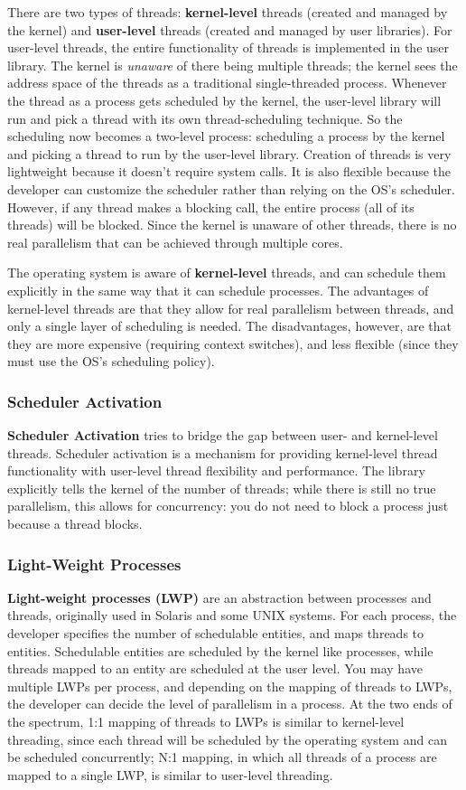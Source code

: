 \documentclass[twoside]{article}
\begin{document}
There are two types of threads: \textbf{kernel-level} threads (created and managed by the kernel) and \textbf{user-level} threads (created and managed by user libraries). For user-level threads, the entire functionality of threads is implemented in the user library. The kernel is \textit{unaware} of there being multiple threads; the kernel sees the address space of the threads as a traditional single-threaded process. Whenever the thread as a process gets scheduled by the kernel, the user-level library will run and pick a thread with its own thread-scheduling technique. So the scheduling now becomes a two-level process: scheduling a process by the kernel and picking a thread to run by the user-level library. Creation of threads is very lightweight because it doesn't require system calls. It is also flexible because the developer can customize the scheduler rather than relying on the OS's scheduler. However, if any thread makes a blocking call, the entire process (all of its threads) will be blocked. Since the kernel is unaware of other threads, there is no real parallelism that can be achieved through multiple cores.

The operating system is aware of \textbf{kernel-level} threads, and can schedule them explicitly in the same way that it can schedule processes. The advantages of kernel-level threads are that they allow for real parallelism between threads, and only a single layer of scheduling is needed. The disadvantages, however, are that they are more expensive (requiring context switches), and less flexible (since they must use the OS's scheduling policy). 

\subsubsection{Scheduler Activation}
\textbf{Scheduler Activation} tries to bridge the gap between user- and kernel-level threads. Scheduler activation is a mechanism for providing kernel-level thread functionality with user-level thread flexibility and performance. The library explicitly tells the kernel of the number of threads; while there is still no true parallelism, this allows for concurrency: you do not need to block a process just because a thread blocks. 

\subsubsection{Light-Weight Processes}
\textbf{Light-weight processes (LWP)} are an abstraction between processes and threads, originally used in Solaris and some UNIX systems. For each process, the developer specifies the number of schedulable entities, and maps threads to entities. Schedulable entities are scheduled by the kernel like processes, while threads mapped to an entity are scheduled at the user level. You may have multiple LWPs per process, and depending on the mapping of threads to LWPs, the developer can decide the level of parallelism in a process. At the two ends of the spectrum, 1:1 mapping of threads to LWPs is similar to kernel-level threading, since each thread will be scheduled by the operating system and can be scheduled concurrently; N:1 mapping, in which all threads of a process are mapped to a single LWP, is similar to user-level threading.
\end{document}
